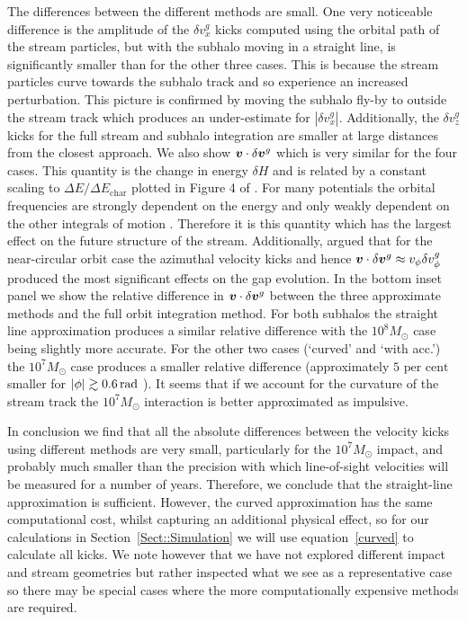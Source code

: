 \documentclass[useAMS,usenatbib,fleqn,a4paper]{mn2e}
\def\rad{\,\rm rad}
\def\percent{\text{ per cent}}
\newcommand{\bs}[1]{\bmath{#1}}
\def\percent{\text{ per cent}}
\begin{document}
The differences between the different methods are small. One very noticeable difference is the amplitude of the $\delta v^g_x$ kicks computed using the orbital path of the stream particles, but with the subhalo moving in a straight line, is significantly smaller than for the other three cases. This is because the stream particles curve towards the subhalo track and so experience an increased perturbation. This picture is confirmed by moving the subhalo fly-by to outside the stream track which produces an under-estimate for $|\delta v^g_x|$. Additionally, the $\delta v^g_z$ kicks for the full stream and subhalo integration are smaller at large distances from the closest approach. We also show $\bs{v}\cdot\delta\bs{v}^g$ which is very similar for the four cases. This quantity is the change in energy $\delta H$ and is related by a constant scaling to $\Delta E/\Delta E_\mathrm{char}$ plotted in Figure 4 of \cite{YoonJohnstonHogg}. For many potentials the orbital frequencies are strongly dependent on the energy and only weakly dependent on the other integrals of motion \citep{BinneyTremaine}. Therefore it is this quantity which has the largest effect on the future structure of the stream.  Additionally, \cite{ErkalBelokurov2015} argued that for the near-circular orbit case the azimuthal velocity kicks and hence $\bs{v}\cdot\delta\bs{v}^g\approx v_\phi\delta v_\phi^g$ produced the most significant effects on the gap evolution. In the bottom inset panel we show the relative difference in $\bs{v}\cdot\delta\bs{v}^g$ between the three approximate methods and the full orbit integration method. For both subhalos the straight line approximation produces a similar relative difference with the $10^8M_\odot$ case being slightly more accurate. For the other two cases (`curved' and `with acc.') the $10^7M_\odot$ case produces a smaller relative difference (approximately $5\percent$ smaller for $|\phi|\gtrsim0.6\rad$ ). It seems that if we account for the curvature of the stream track the $10^7M_\odot$ interaction is better approximated as impulsive.

In conclusion we find that all the absolute differences between the velocity kicks using different methods are very small, particularly for the $10^7M_\odot$ impact, and probably much smaller than the precision with which line-of-sight velocities will be measured for a number of years. Therefore, we conclude that the straight-line approximation is sufficient. However, the curved approximation has the same computational cost, whilst capturing an additional physical effect, so for our calculations in Section~\ref{Sect::Simulation} we will use equation~\eqref{curved} to calculate all kicks. We note however that we have not explored different impact and stream geometries but rather inspected what we see as a representative case so there may be special cases where the more computationally expensive methods are required.
\end{document}
